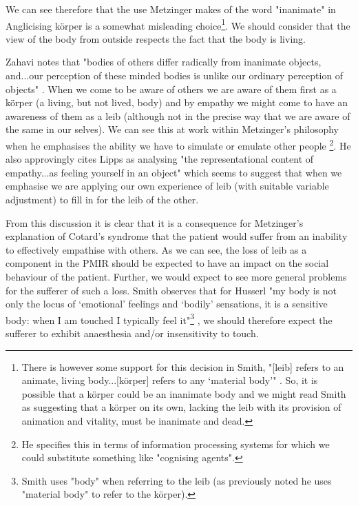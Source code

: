 We can see therefore that the use Metzinger makes of the word "inanimate" in Anglicising k\"{o}rper is a somewhat misleading choice\footnote{There is however some support for this decision in Smith, "[leib] refers to an animate, living body...[k\"{o}rper] refers to any ‘material body'" \cite[p. 220]{smith2003}. So, it is possible that a k\"{o}rper could be an inanimate body and we might read Smith as suggesting that a k\"{o}rper on its own, lacking the leib with its provision of animation and vitality, must be inanimate and dead.}. We should consider that the view of the body from outside respects the fact that the body is living.

Zahavi notes that "bodies of others differ radically from inanimate objects, and...our perception of these minded bodies is unlike our ordinary perception of objects" \cite[p. 155]{zahavi2005}. When we come to be aware of others we are aware of them first as a k\"{ö}rper (a living, but not lived, body) and by empathy we might come to have an awareness of them as a leib (although not in the precise way that we are aware of the same in our selves). We can see this at work within Metzinger's philosophy when he emphasises the ability we have to simulate or emulate other people \cite[pp. 300-301]{zahavi2005}\footnote{He specifies this in terms of information processing systems for which we could substitute something like "cognising agents".}. He also approvingly cites Lipps as analysing "the representational content of empathy...as feeling yourself in an object" which seems to suggest that when we emphasise we are applying our own experience of leib (with suitable variable adjustment) to fill in for the leib of the other.

From this discussion it is clear that it is a consequence for Metzinger's explanation of Cotard's syndrome that the patient would suffer from an inability to effectively empathise with others. As we can see, the loss of leib as a component in the PMIR should be expected to have an impact on the social behaviour of the patient. Further, we would expect to see more general problems for the sufferer of such a loss. Smith observes that for Husserl "my body is not only the locus of ‘emotional' feelings and ‘bodily' sensations, it is a sensitive body: when I am touched I typically feel it"\footnote{Smith uses "body" when referring to the leib (as previously noted he uses "material body" to refer to the k\"{o}rper).} \cite[p. 221]{smith2003}, we should therefore expect the sufferer to exhibit anaesthesia and/or insensitivity to touch.

